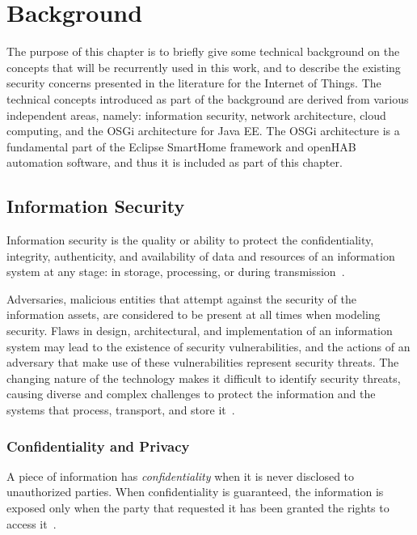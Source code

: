 \documentclass[12pt]{article}
\newcommand{\TODO}{\todo[inline]}
\begin{document}

\newpage
\section{Background} 
\label{sec:art}
\TODO{SUMMARY}
The purpose of this chapter is to briefly give some technical background on the concepts that will be recurrently used in this work, and to describe the existing security concerns presented in the literature for the Internet of Things. The technical concepts introduced as part of the background are derived from various independent areas, namely: information security, network architecture, cloud computing, and the OSGi architecture for Java EE. The OSGi architecture is a fundamental part of the Eclipse SmartHome framework and openHAB automation software, and thus it is included as part of this chapter.

\subsection{Information Security}

Information security is the quality or ability to protect the confidentiality, integrity, authenticity, and availability of data and resources of an information system at any stage: in storage, processing, or during transmission~\cite{whitman2011principles}.

Adversaries, malicious entities that attempt against the security of the information assets, are considered to be present at all times when modeling security. Flaws in design, architectural, and implementation of an information system may lead to the existence of security vulnerabilities, and the actions of an adversary that make use of these vulnerabilities represent security threats. The changing nature of the technology makes it difficult to identify security threats, causing diverse and complex challenges to protect the information and the systems that process, transport, and store it~\cite{whitman2003}.

\subsubsection{Confidentiality and Privacy}

A piece of information has \emph{confidentiality} when it is never disclosed to unauthorized parties. When confidentiality is guaranteed, the information is exposed only when the party that requested it has been granted the rights to access it~\cite{whitman2011principles}.
\end{document}
